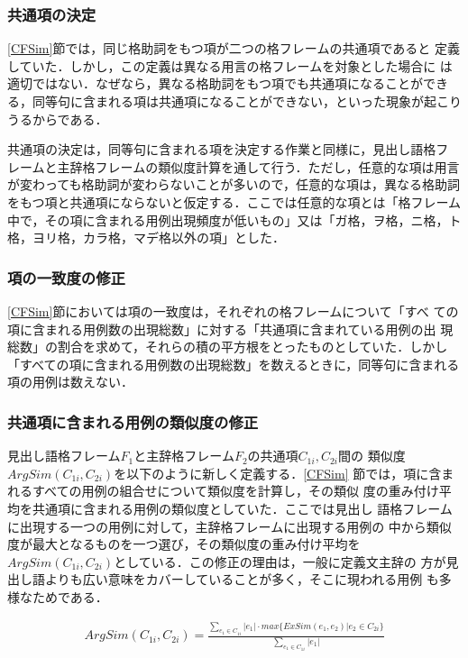 \subsubsection{共通項の決定}

\ref{CFSim}節では，同じ格助詞をもつ項が二つの格フレームの共通項であると
定義していた．しかし，この定義は異なる用言の格フレームを対象とした場合に
は適切ではない．なぜなら，異なる格助詞をもつ項でも共通項になることができ
る，同等句に含まれる項は共通項になることができない，といった現象が起こり
うるからである．

共通項の決定は，同等句に含まれる項を決定する作業と同様に，見出し語格フ
レームと主辞格フレームの類似度計算を通して行う．ただし，任意的な項は用言
が変わっても格助詞が変わらないことが多いので，任意的な項は，異なる格助詞
をもつ項と共通項にならないと仮定する．ここでは任意的な項とは「格フレーム
中で，その項に含まれる用例出現頻度が低いもの」又は「ガ格，ヲ格，ニ格，ト
格，ヨリ格，カラ格，マデ格以外の項」とした．


\subsubsection{項の一致度の修正}

\ref{CFSim}節においては項の一致度は，それぞれの格フレームについて「すべ
ての項に含まれる用例数の出現総数」に対する「共通項に含まれている用例の出
現総数」の割合を求めて，それらの積の平方根をとったものとしていた．しかし
「すべての項に含まれる用例数の出現総数」を数えるときに，同等句に含まれる
項の用例は数えない．



\subsubsection{共通項に含まれる用例の類似度の修正}

見出し語格フレーム$F_1$と主辞格フレーム$F_2$の共通項$C_{1i}, C_{2i}$間の
類似度$ArgSim(C_{1i},C_{2i})$を以下のように新しく定義する．\ref{CFSim}
節では，項に含まれるすべての用例の組合せについて類似度を計算し，その類似
度の重み付け平均を共通項に含まれる用例の類似度としていた．ここでは見出し
語格フレームに出現する一つの用例に対して，主辞格フレームに出現する用例の
中から類似度が最大となるものを一つ選び，その類似度の重み付け平均を
$ArgSim(C_{1i},C_{2i})$としている．この修正の理由は，一般に定義文主辞の
方が見出し語よりも広い意味をカバーしていることが多く，そこに現われる用例
も多様なためである．

\begin{eqnarray*}
 ArgSim(C_{1i},C_{2i}) =
  \frac{
  \sum_{ e_1 \in C_{1i} }|e_1| \cdot max \{ ExSim(e_1,e_2) | e_2 \in C_{2i} \}
  }
  {
  \sum_{ e_1 \in C_{1i} } |e_1|
  }
\end{eqnarray*}



